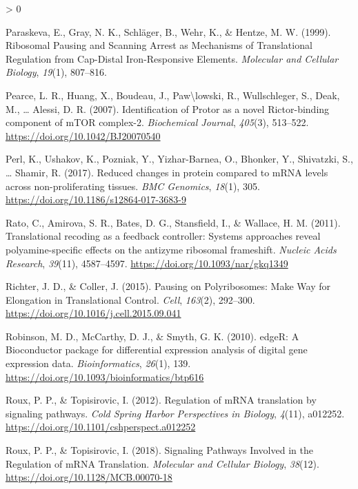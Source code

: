 \documentclass[
  12pt,
  openany]{book}
\newlength{\cslhangindent}
\newenvironment{CSLReferences}[2] %
 {%
  \setlength{\parindent}{0pt}
  \ifodd #1 \everypar{\setlength{\hangindent}{\cslhangindent}}\ignorespaces\fi
  \ifnum #2 > 0
  \setlength{\parskip}{#2\baselineskip}
  \fi
 }%
 {}
\begin{document}
\begin{CSLReferences}{1}{0}
\leavevmode\hypertarget{ref-Paraskeva1999}{}%
Paraskeva, E., Gray, N. K., Schläger, B., Wehr, K., \& Hentze, M. W. (1999). Ribosomal {Pausing} and {Scanning Arrest} as {Mechanisms} of {Translational Regulation} from {Cap}-{Distal} {Iron}-{Responsive Elements}. \emph{Molecular and Cellular Biology}, \emph{19}(1), 807--816.

\leavevmode\hypertarget{ref-Pearce2007}{}%
Pearce, L. R., Huang, X., Boudeau, J., Paw\textbackslash lowski, R., Wullschleger, S., Deak, M., \ldots{} Alessi, D. R. (2007). Identification of {Protor} as a novel {Rictor}-binding component of {mTOR} complex-2. \emph{Biochemical Journal}, \emph{405}(3), 513--522. \url{https://doi.org/10.1042/BJ20070540}

\leavevmode\hypertarget{ref-Perl2017}{}%
Perl, K., Ushakov, K., Pozniak, Y., Yizhar-Barnea, O., Bhonker, Y., Shivatzki, S., \ldots{} Shamir, R. (2017). Reduced changes in protein compared to {mRNA} levels across non-proliferating tissues. \emph{BMC Genomics}, \emph{18}(1), 305. \url{https://doi.org/10.1186/s12864-017-3683-9}

\leavevmode\hypertarget{ref-Rato2011}{}%
Rato, C., Amirova, S. R., Bates, D. G., Stansfield, I., \& Wallace, H. M. (2011). Translational recoding as a feedback controller: Systems approaches reveal polyamine-specific effects on the antizyme ribosomal frameshift. \emph{Nucleic Acids Research}, \emph{39}(11), 4587--4597. \url{https://doi.org/10.1093/nar/gkq1349}

\leavevmode\hypertarget{ref-Richter2015}{}%
Richter, J. D., \& Coller, J. (2015). Pausing on {Polyribosomes}: {Make Way} for {Elongation} in {Translational Control}. \emph{Cell}, \emph{163}(2), 292--300. \url{https://doi.org/10.1016/j.cell.2015.09.041}

\leavevmode\hypertarget{ref-Robinson2010}{}%
Robinson, M. D., McCarthy, D. J., \& Smyth, G. K. (2010). {edgeR}: A {Bioconductor} package for differential expression analysis of digital gene expression data. \emph{Bioinformatics}, \emph{26}(1), 139. \url{https://doi.org/10.1093/bioinformatics/btp616}

\leavevmode\hypertarget{ref-Roux2012}{}%
Roux, P. P., \& Topisirovic, I. (2012). Regulation of {mRNA} translation by signaling pathways. \emph{Cold Spring Harbor Perspectives in Biology}, \emph{4}(11), a012252. \url{https://doi.org/10.1101/cshperspect.a012252}

\leavevmode\hypertarget{ref-Roux2018}{}%
Roux, P. P., \& Topisirovic, I. (2018). Signaling {Pathways Involved} in the {Regulation} of {mRNA Translation}. \emph{Molecular and Cellular Biology}, \emph{38}(12). \url{https://doi.org/10.1128/MCB.00070-18}


\end{CSLReferences}
\end{document}
